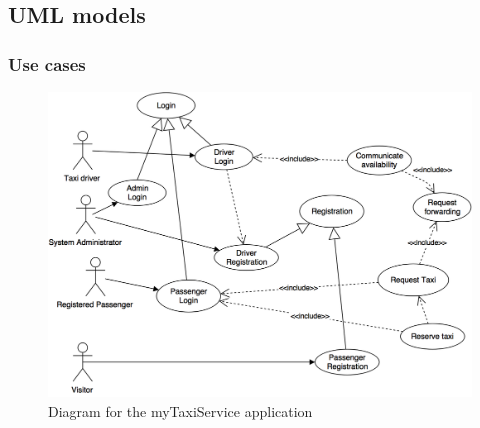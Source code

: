 \documentclass[a4paper,12pt,dvipsnames]{article}%
\begin{document}
\subsection{UML models}
\subsubsection{Use cases}
\begin{figure}[H]
\includegraphics[scale=0.3]{use_cases.png}
\caption{Diagram for the myTaxiService application}
\end{figure}
\break
\end{document}
